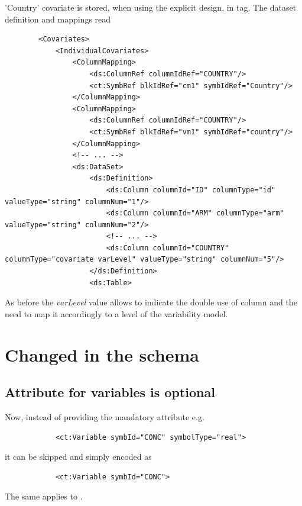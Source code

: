 'Country' covariate is stored, when using the explicit design, in  tag.
The dataset definition and mappings read

\lstset{language=XML}
\begin{lstlisting}
        <Covariates>
            <IndividualCovariates>
                <ColumnMapping>
                    <ds:ColumnRef columnIdRef="COUNTRY"/>
                    <ct:SymbRef blkIdRef="cm1" symbIdRef="Country"/>
                </ColumnMapping>
                <ColumnMapping>
                    <ds:ColumnRef columnIdRef="COUNTRY"/>
                    <ct:SymbRef blkIdRef="vm1" symbIdRef="country"/> 
                </ColumnMapping>
                <!-- ... -->
                <ds:DataSet>
                    <ds:Definition>
                        <ds:Column columnId="ID" columnType="id" valueType="string" columnNum="1"/>
                        <ds:Column columnId="ARM" columnType="arm" valueType="string" columnNum="2"/>
                        <!-- ... -->
                        <ds:Column columnId="COUNTRY" columnType="covariate varLevel" valueType="string" columnNum="5"/>
                    </ds:Definition>
                    <ds:Table>
\end{lstlisting}

As before the \emph{varLevel} value allows to indicate the double use of 
column  and the need to map it accordingly to a level 
of the variability model.


\section{Changed in the schema}
\label{sec:schemaChanges}
\subsection{Attribute  for variables is optional}
Now, instead of providing the mandatory attribute e.g.
\lstset{language=XML}
\begin{lstlisting}
			<ct:Variable symbId="CONC" symbolType="real">
\end{lstlisting}
it can be skipped and simply encoded as 
\lstset{language=XML}
\begin{lstlisting}
			<ct:Variable symbId="CONC">
\end{lstlisting}
The same applies to .


